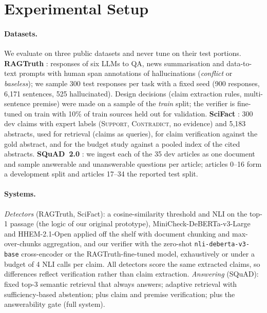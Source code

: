 \section{Experimental Setup}
\label{sec:setup}

\paragraph{Datasets.}
We evaluate on three public datasets and never tune on their test portions.
\textbf{RAGTruth} \citep{niu2024ragtruth}: responses of six LLMs to QA, news summarisation and data-to-text prompts with human span annotations of hallucinations (\emph{conflict} or \emph{baseless}); we sample 300 test responses per task with a fixed seed (900 responses, 6{,}171 sentences, 525 hallucinated). Design decisions (claim extraction rules, multi-sentence premise) were made on a sample of the \emph{train} split; the verifier is fine-tuned on train with 10\% of train sources held out for validation.
\textbf{SciFact} \citep{wadden2020scifact}: 300 dev claims with expert labels (\textsc{Support}, \textsc{Contradict}, no evidence) and 5{,}183 abstracts, used for retrieval (claims as queries), for claim verification against the gold abstract, and for the budget study against a pooled index of the cited abstracts.
\textbf{SQuAD~2.0} \citep{rajpurkar2018squad2}: we ingest each of the 35 dev articles as one document and sample answerable and unanswerable questions per article; articles 0--16 form a development split and articles 17--34 the reported test split.

\paragraph{Systems.}
\emph{Detectors} (RAGTruth, SciFact): a cosine-similarity threshold and NLI on the top-1 passage (the logic of our original prototype), MiniCheck-DeBERTa-v3-Large \citep{tang2024minicheck} and HHEM-2.1-Open \citep{vectara2024hhem} applied off the shelf with document chunking and max-over-chunks aggregation, and our verifier with the zero-shot \texttt{nli-deberta-v3-base} cross-encoder or the RAGTruth-fine-tuned model, exhaustively or under a budget of 4 NLI calls per claim.
All detectors score the same extracted claims, so differences reflect verification rather than claim extraction.
\emph{Answering} (SQuAD): fixed top-3 semantic retrieval that always answers; adaptive retrieval with sufficiency-based abstention; plus claim and premise verification; plus the answerability gate (full system).

